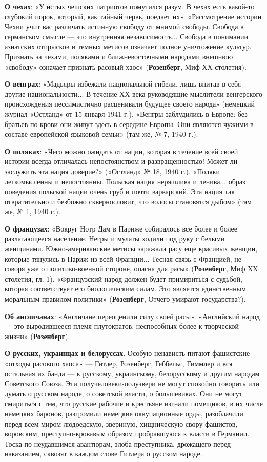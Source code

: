 \documentclass[12pt, a4paper, openany]{book}
\begin{document}
\textbf{О чехах}: «У истых чешских патриотов помутился разум. В чехах есть какой-то глубокий порок, который, как тайный червь, поедает их». «Рассмотрение истории Чехии учит вас различать истинную свободу от мнимой свободы. Свобода в германском смысле — это внутренняя независимость... Свобода в понимании азиатских отпрысков и темных метисов означает полное уничтожение культур. Признать за чехами, поляками и ближневосточными народами внешнюю «свободу» означает признать расовый хаос» (\textbf{Розенберг}, Миф ХХ столетия).

\textbf{О венграх}: «Мадьяры избежали национальной гибели, лишь впитав в себя другие национальности... В течение ХХ века руководящие мыслители венгерского происхождения пессимистично расценивали будущее своего народа» (немецкий журнал «Остланд» от 15 января 1941 г.). «Венгры заблудились в Европе: без братьев по крови они живут здесь в середине Европы. Они являются чужими в составе европейской языковой семьи» (там же, № 7, 1940 г.).

\textbf{О поляках}: «Чего можно ожидать от нации, которая в течение всей своей истории всегда отличалась непостоянством и развращенностью! Может ли заслужить эта нация доверие?» («Остланд» № 18, 1940 г.). «Поляки легкомысленны и непостоянны. Польская нация неряшлива и ленива... образ поведения польской нации очень груб и почти варварский. Эта нация так отвратительно и безбожно сквернословит, что волосы становятся дыбом» (там же, № 1, 1940 г.).

\textbf{О французах}: «Вокруг Нотр Дам в Париже собиралось все более и более разлагающееся население. Негры и мулаты ходили под руку с белыми женщинами. Южно-американские метисы заражали расу еще красивых женщин, которые тянулись в Париж из всей Франции... Тесная связь с Францией, не говоря уже о политико-военной стороне, опасна для расы» (\textbf{Розенберг}, Миф ХХ столетия, гл. 1). «Французский народ должен будет примириться с судьбой, которая соответствует его биологическим силам. Это является единственным моральным правилом политики» (\textbf{Розенберг}, Отчего умирают государства?).

\textbf{Об англичанах}: «Англичане переоценили силу своей расы». «Английский народ — это выродившееся племя плутократов, неспособных более к творческой жизни» (\textbf{Розенберг}).

\textbf{О русских, украинцах и белоруссах}. Особую ненависть питают фашистские «отходы расового хаоса» — Гитлер, Розенберг, Геббельс, Гиммлер и вся остальная их банда — к русскому, украинскому, белорусскому и другим народам Советского Союза. Эти получеловеки-полузвери не могут спокойно говорить или думать о русском народе, о советской власти, о большевиках. Они не могут смириться с тем, что русские рабочие и крестьяне изгнали помещиков, в их числе немецких баронов, разгромили немецкие оккупационные орды, разоблачили перед всем миром людоедскую, звериную, хищническую свору фашистов, воровским, преступно-кровавым образом пробравшуюся к власти в Германии. Тоска по неудавшимся авантюрам, злоба преступника, дрожащего перед наказанием, сквозят в каждом слове Гитлера о русском народе.
\end{document}
